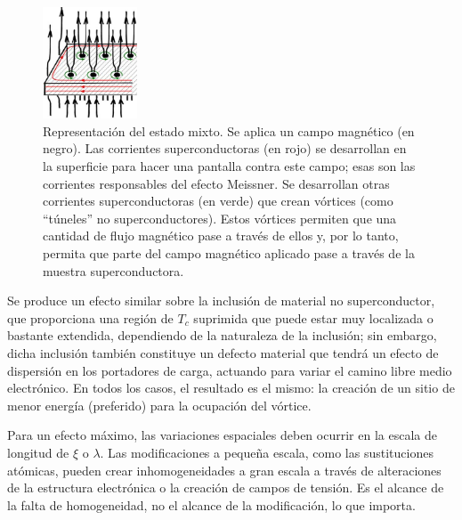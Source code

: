 \documentclass[a4paper,conference]{IEEEtran}
\begin{document}
\begin{figure}[!ht]
				\centering 
				\includegraphics[width=0.25\textwidth]{estado_mixto} 
				\caption{Representaci\'{o}n del estado mixto. Se aplica un campo magn\'{e}tico
				(en negro). Las corrientes superconductoras (en rojo) se desarrollan en
				la superficie para hacer una pantalla contra este campo; esas son las
				corrientes responsables del efecto Meissner. Se desarrollan otras
				corrientes superconductoras (en verde) que crean v\'{o}rtices (como
				``t\'{u}neles'' no superconductores). Estos v\'{o}rtices permiten que una cantidad
				de flujo magn\'{e}tico pase a trav\'{e}s de ellos y, por lo tanto, permita que
				parte del campo magn\'{e}tico aplicado pase a trav\'{e}s de la muestra
				superconductora.
				} 
				\label{fig:estado_mixto}
\end{figure}

Se produce un efecto similar
sobre la inclusi\'{o}n de material no superconductor, que proporciona una regi\'{o}n de
$T_c$ suprimida que puede estar muy localizada o bastante extendida, dependiendo de
la naturaleza de la inclusi\'{o}n; sin embargo, dicha inclusi\'{o}n tambi\'{e}n constituye
un defecto material que tendr\'{a} un efecto de dispersi\'{o}n en los portadores de
carga, actuando para variar el camino libre medio electr\'{o}nico. %
En todos los casos, el resultado es el mismo: la creaci\'{o}n de un sitio de
menor energ\'{i}a (preferido) para la ocupaci\'{o}n del v\'{o}rtice.

Para un efecto m\'{a}ximo, las variaciones espaciales deben ocurrir en la escala
de longitud de $\xi$ o $ \lambda$. 
Las modificaciones a peque\~{n}a escala, como las
sustituciones at\'{o}micas, pueden crear inhomogeneidades a gran escala a
trav\'{e}s de alteraciones de la estructura electr\'{o}nica o la creaci\'{o}n de
campos de tensi\'{o}n. Es el alcance de la falta de
homogeneidad, no el alcance de la modificaci\'{o}n, lo que importa.  
\end{document}
